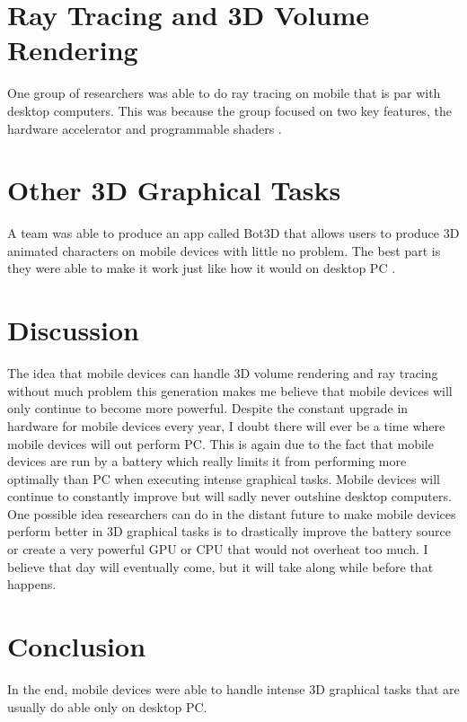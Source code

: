 \documentclass{article}
\begin{document}
\section{Ray Tracing and 3D Volume Rendering}
  One group of researchers was able to do ray tracing on mobile that is par with desktop computers. This was because the group focused on two key features, the hardware accelerator and programmable shaders \cite{10.1145/2543651.2543670}.
  
\section{Other 3D Graphical Tasks}
  A team was able to produce an app called Bot3D that allows users to produce 3D animated characters on mobile devices with little no problem. The best part is they were able to make it work just like how it would on desktop PC \cite{10.1145/3132787.3132807}.
  
\cite{7579401}
\cite{7111373}
\cite{7980370}
\cite{8047282}
\cite{7030191}

\cite{10.1145/3365610.3368420}
\cite{10.1145/2503512.2503521}

\section{Discussion}
  The idea that mobile devices can handle 3D volume rendering and ray tracing without much problem this generation makes me believe that mobile devices will only continue to become more powerful. Despite the constant upgrade in hardware for mobile devices every year, I doubt there will ever be a time where mobile devices will out perform PC. This is again due to the fact that mobile devices are run by a battery which really limits it from performing more optimally than PC when executing intense graphical tasks. Mobile devices will continue to constantly improve but will sadly never outshine desktop computers. One possible idea researchers can do in the distant future to make mobile devices perform better in 3D graphical tasks is to drastically improve the battery source or create a very powerful GPU or CPU that would not overheat too much. I believe that day will eventually come, but it will take along while before that happens. 
\section{Conclusion}
 In the end, mobile devices were able to handle intense 3D graphical tasks that are usually do able only on desktop PC. 


\end{document}
